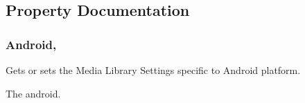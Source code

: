\subsection{Property Documentation}
\hypertarget{class_voxel_busters_1_1_native_plugins_1_1_media_library_settings_a1c2d6ed884eda0a6f3e7bb4913332b0a}{}
\subsubsection[{Android}]{ Android\hspace{0.3cm}{\ttfamily [get]}, {\ttfamily [set]}}\label{class_voxel_busters_1_1_native_plugins_1_1_media_library_settings_a1c2d6ed884eda0a6f3e7bb4913332b0a}


Gets or sets the Media Library Settings specific to Android platform. 

The android.